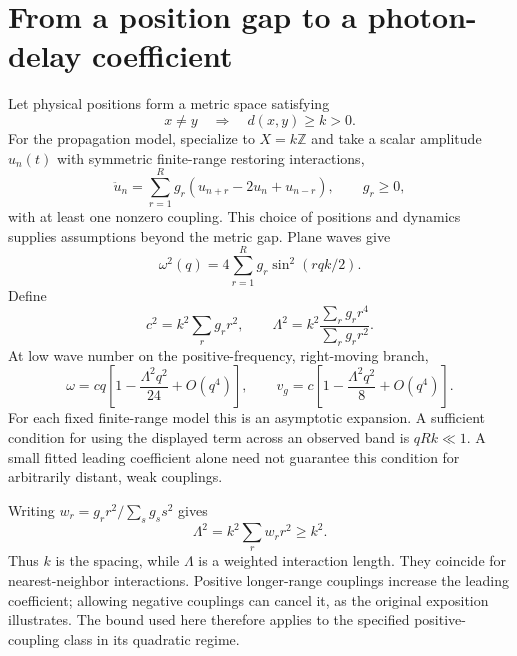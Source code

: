 \documentclass[11pt]{article}
\begin{document}
\newpage
\section{From a position gap to a photon-delay coefficient}
Let physical positions form a metric space satisfying
\begin{equation}
 x\ne y\quad\Longrightarrow\quad d(x,y)\geq k>0.
\end{equation}
For the propagation model, specialize to $X=k\mathbb Z$ and take a scalar amplitude $u_n(t)$ with symmetric finite-range restoring interactions,
\begin{equation}\label{wave}
 \ddot u_n=\sum_{r=1}^{R}g_r(u_{n+r}-2u_n+u_{n-r}),
 \qquad g_r\geq0,
\end{equation}
with at least one nonzero coupling. This choice of positions and dynamics supplies assumptions beyond the metric gap. Plane waves give
\begin{equation}
 \omega^2(q)=4\sum_{r=1}^{R}g_r\sin^2(rqk/2).
\end{equation}
Define
\begin{equation}\label{length}
 c^2=k^2\sum_r g_r r^2,\qquad
 \Lambda^2=k^2\frac{\sum_r g_r r^4}{\sum_r g_r r^2}.
\end{equation}
At low wave number on the positive-frequency, right-moving branch,
\begin{equation}
 \omega=cq\left[1-\frac{\Lambda^2q^2}{24}+O(q^4)\right],
 \qquad
 v_g=c\left[1-\frac{\Lambda^2q^2}{8}+O(q^4)\right].
\end{equation}
For each fixed finite-range model this is an asymptotic expansion. A sufficient condition for using the displayed term across an observed band is $qRk\ll1$. A small fitted leading coefficient alone need not guarantee this condition for arbitrarily distant, weak couplings.

Writing $w_r=g_r r^2/\sum_s g_s s^2$ gives
\begin{equation}\label{gapbound}
 \Lambda^2=k^2\sum_r w_r r^2\geq k^2.
\end{equation}
Thus $k$ is the spacing, while $\Lambda$ is a weighted interaction length. They coincide for nearest-neighbor interactions. Positive longer-range couplings increase the leading coefficient; allowing negative couplings can cancel it, as the original exposition illustrates. The bound used here therefore applies to the specified positive-coupling class in its quadratic regime.
\end{document}
